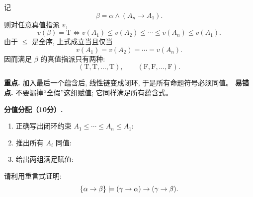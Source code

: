 \documentclass[a4paper, justified]{tufte-handout}
\begin{document}
\begin{solution}
\begin{enumerate}[(1)]
      记
      \[
        \beta = \alpha \land (A_n \to A_1).
      \]
      则对任意真值指派 $v$,
      \[
        v(\beta) = \mathrm{T}
        \iff
        v(A_1) \le v(A_2) \le \cdots \le v(A_n) \le v(A_1).
      \]
      由于 $\le$ 是全序, 上式成立当且仅当
      \[
        v(A_1) = v(A_2) = \cdots = v(A_n).
      \]
      因而满足 $\beta$ 的真值指派只有两种:
      \[
        (\mathrm{T}, \mathrm{T}, \dots, \mathrm{T}),
        \qquad
        (\mathrm{F}, \mathrm{F}, \dots, \mathrm{F}).
      \]

      \begin{remark}
        \textbf{重点.} 加入最后一个蕴含后, 线性链变成闭环, 于是所有命题符号必须同值。
        \textbf{易错点.} 不要漏掉“全假”这组赋值; 它同样满足所有蕴含式。
      \end{remark}

      \textbf{分值分配（10分）.}
      \begin{enumerate}[(1)]
        \item 正确写出闭环约束 $A_1 \le \cdots \le A_n \le A_1$: 
        \item 推出所有 $A_i$ 同值: 
        \item 给出两组满足赋值: 
      \end{enumerate}
  \end{enumerate}

\end{solution}

\newpage
\begin{problem}[重言蕴含]
  请利用重言式证明:
  \[
    \{\alpha \to \beta\} \models
      (\gamma \to \alpha) \to (\gamma \to \beta).
  \]
\end{problem}
\end{document}
